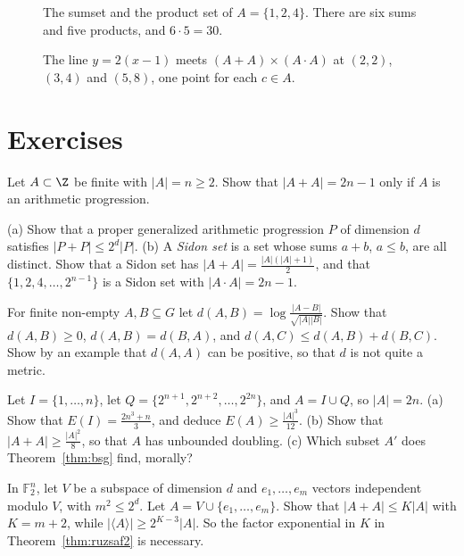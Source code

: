 \begin{figure}[ht]
\centering
{}
\caption{The sumset and the product set of $A=\{1,2,4\}$. There are six sums and five products, and $6\cdot5=30$.}
\label{fig:v14-extra-11-a}
\end{figure}

\begin{figure}[ht]
\centering
{}
\caption{The line $y=2(x-1)$ meets $(A+A)\times(A\cdot A)$ at $(2,2)$, $(3,4)$ and $(5,8)$, one point for each $c\in A$.}
\label{fig:v14-extra-11-b}
\end{figure}

\section{Exercises}

\begin{exercise}[$\star$]\label{ex:inverse}
Let $A\subset\Z$ be finite with $|A|=n\ge2$. Show that $|A+A|=2n-1$ only if $A$ is an arithmetic progression.
\end{exercise}

\begin{exercise}[$\star$]\label{ex:gap}
(a) Show that a proper generalized arithmetic progression $P$ of dimension $d$ satisfies $|P+P|\le2^d|P|$.
(b) A \emph{Sidon set} is a set whose sums $a+b$, $a\le b$, are all distinct. Show that a Sidon set has $|A+A|=\frac{|A|(|A|+1)}2$, and that $\{1,2,4,\dots,2^{n-1}\}$ is a Sidon set with $|A\cdot A|=2n-1$.
\end{exercise}

\begin{exercise}[$\star\star$]\label{ex:ruzsadist}
For finite non-empty $A,B\subseteq G$ let $d(A,B)=\log\frac{|A-B|}{\sqrt{|A||B|}}$. Show that $d(A,B)\ge0$, $d(A,B)=d(B,A)$, and $d(A,C)\le d(A,B)+d(B,C)$. Show by an example that $d(A,A)$ can be positive, so that $d$ is not quite a metric.
\end{exercise}

\begin{exercise}[$\star\star$]\label{ex:energy}
Let $I=\{1,\dots,n\}$, let $Q=\{2^{n+1},2^{n+2},\dots,2^{2n}\}$, and $A=I\cup Q$, so $|A|=2n$.
(a) Show that $E(I)=\frac{2n^3+n}3$, and deduce $E(A)\ge\frac{|A|^3}{12}$.
(b) Show that $|A+A|\ge\frac{|A|^2}8$, so that $A$ has unbounded doubling.
(c) Which subset $A'$ does Theorem~\ref{thm:bsg} find, morally?
\end{exercise}

\begin{exercise}[$\star\star$]\label{ex:freimanbad}
In $\mathbb F_2^n$, let $V$ be a subspace of dimension $d$ and $e_1,\dots,e_m$ vectors independent modulo $V$, with $m^2\le2^d$. Let $A=V\cup\{e_1,\dots,e_m\}$. Show that $|A+A|\le K|A|$ with $K=m+2$, while $|\langle A\rangle|\ge2^{K-3}|A|$. So the factor exponential in $K$ in Theorem~\ref{thm:ruzsaf2} is necessary.
\end{exercise}

